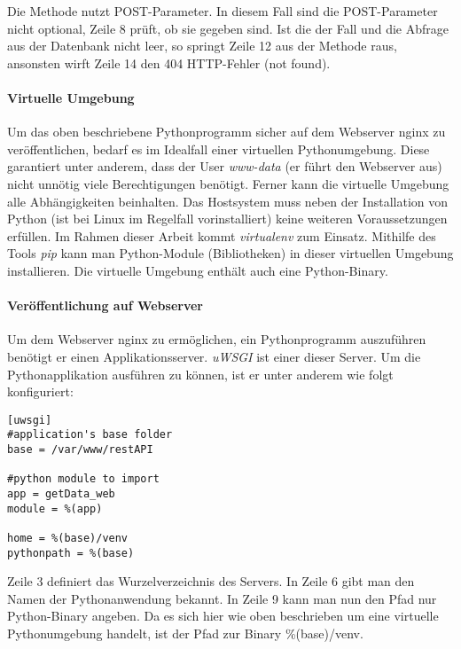 Die Methode nutzt POST-Parameter. In diesem Fall sind die POST-Parameter nicht optional, Zeile 8 prüft, ob sie gegeben sind. Ist die der Fall und die Abfrage aus der Datenbank nicht leer, so springt Zeile 12 aus der Methode raus, ansonsten wirft Zeile 14 den 404 HTTP-Fehler (not found). 

\paragraph{Virtuelle Umgebung}
Um das oben beschriebene Pythonprogramm sicher auf dem Webserver nginx zu veröffentlichen, bedarf es im Idealfall einer virtuellen Pythonumgebung. Diese garantiert unter anderem, dass der User \textit{www-data} (er führt den Webserver aus) nicht unnötig viele Berechtigungen benötigt. Ferner kann die virtuelle Umgebung alle Abhängigkeiten beinhalten. Das Hostsystem muss neben der Installation von Python (ist bei Linux im Regelfall vorinstalliert) keine weiteren Voraussetzungen erfüllen. Im Rahmen dieser Arbeit kommt \textit{virtualenv} zum Einsatz. Mithilfe des Tools \textit{pip} kann man Python-Module (Bibliotheken) in dieser virtuellen Umgebung installieren. Die virtuelle Umgebung enthält auch eine Python-Binary. 

\paragraph{Veröffentlichung auf Webserver}
Um dem Webserver nginx zu ermöglichen, ein Pythonprogramm auszuführen benötigt er einen Applikationsserver. \textit{uWSGI} ist einer dieser Server. Um die Pythonapplikation ausführen zu können, ist er unter anderem wie folgt konfiguriert:
\lstset{language=bash, numbers=left, breaklines=true}
\begin{lstlisting}
[uwsgi]
#application's base folder
base = /var/www/restAPI

#python module to import
app = getData_web
module = %(app)

home = %(base)/venv
pythonpath = %(base)
\end{lstlisting}
Zeile 3 definiert das Wurzelverzeichnis des Servers. In Zeile 6 gibt man den Namen der Pythonanwendung bekannt. In Zeile 9 kann man nun den Pfad nur Python-Binary angeben. Da es sich hier wie oben beschrieben um eine virtuelle Pythonumgebung handelt, ist der Pfad zur Binary \%(base)/venv.